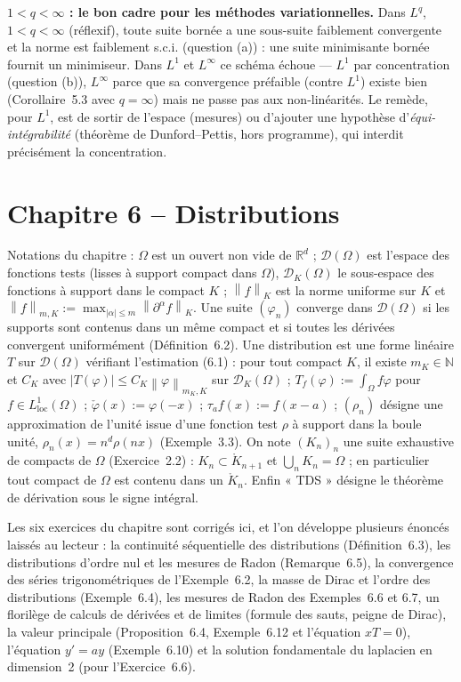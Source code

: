 \documentclass[11pt,a4paper]{article}
\newcommand{\R}{\mathbb{R}}
\newcommand{\N}{\mathbb{N}}
\newcommand{\interieur}[1]{\mathring{#1}}
\newcommand{\norm}[1]{\left\|#1\right\|}
\newcommand{\D}{\mathcal{D}}
\theoremstyle{definition}
\begin{document}
\begin{pointcle}
\textbf{$1<q<\infty$ : le bon cadre pour les méthodes variationnelles.} Dans $L^q$, $1<q<\infty$ (réflexif), toute suite bornée a une sous-suite faiblement convergente et la norme est faiblement s.c.i. (question (a)) : une suite minimisante bornée fournit un minimiseur. Dans $L^1$ et $L^\infty$ ce schéma échoue — $L^1$ par concentration (question (b)), $L^\infty$ parce que sa convergence préfaible (contre $L^1$) existe bien (Corollaire~5.3 avec $q=\infty$) mais ne passe pas aux non-linéarités. Le remède, pour $L^1$, est de sortir de l'espace (mesures) ou d'ajouter une hypothèse d'\emph{équi-intégrabilité} (théorème de Dunford--Pettis, hors programme), qui interdit précisément la concentration.
\end{pointcle}


\section{Chapitre 6 -- Distributions}

\begin{commentaire}
Notations du chapitre : $\Omega$ est un ouvert non vide de $\R^d$ ; $\D(\Omega)$ est l'espace des fonctions tests (lisses à support compact dans $\Omega$), $\D_K(\Omega)$ le sous-espace des fonctions à support dans le compact $K$ ; $\norm f_K$ est la norme uniforme sur $K$ et $\norm f_{m,K}:=\max_{|\alpha|\le m}\norm{\partial^\alpha f}_K$. Une suite $(\varphi_n)$ converge dans $\D(\Omega)$ si les supports sont contenus dans un même compact et si toutes les dérivées convergent uniformément (Définition~6.2). Une distribution est une forme linéaire $T$ sur $\D(\Omega)$ vérifiant l'estimation (6.1) : pour tout compact $K$, il existe $m_K\in\N$ et $C_K$ avec $|T(\varphi)|\le C_K\norm\varphi_{m_K,K}$ sur $\D_K(\Omega)$ ; $T_f(\varphi):=\int_\Omega f\varphi$ pour $f\in L^1_{\mathrm{loc}}(\Omega)$ ; $\check\varphi(x):=\varphi(-x)$ ; $\tau_af(x):=f(x-a)$ ; $(\rho_n)$ désigne une approximation de l'unité issue d'une fonction test $\rho$ à support dans la boule unité, $\rho_n(x)=n^d\rho(nx)$ (Exemple~3.3). On note $(K_n)_n$ une suite exhaustive de compacts de $\Omega$ (Exercice~2.2) : $K_n\subset\interieur{K}_{n+1}$ et $\bigcup_nK_n=\Omega$ ; en particulier tout compact de $\Omega$ est contenu dans un $\interieur{K}_n$. Enfin « TDS » désigne le théorème de dérivation sous le signe intégral.

Les six exercices du chapitre sont corrigés ici, et l'on développe plusieurs énoncés laissés au lecteur : la continuité séquentielle des distributions (Définition~6.3), les distributions d'ordre nul et les mesures de Radon (Remarque~6.5), la convergence des séries trigonométriques de l'Exemple~6.2, la masse de Dirac et l'ordre des distributions (Exemple~6.4), les mesures de Radon des Exemples~6.6 et 6.7, un florilège de calculs de dérivées et de limites (formule des sauts, peigne de Dirac), la valeur principale (Proposition~6.4, Exemple~6.12 et l'équation $xT=0$), l'équation $y'=ay$ (Exemple~6.10) et la solution fondamentale du laplacien en dimension~2 (pour l'Exercice~6.6).
\end{commentaire}
\end{document}
